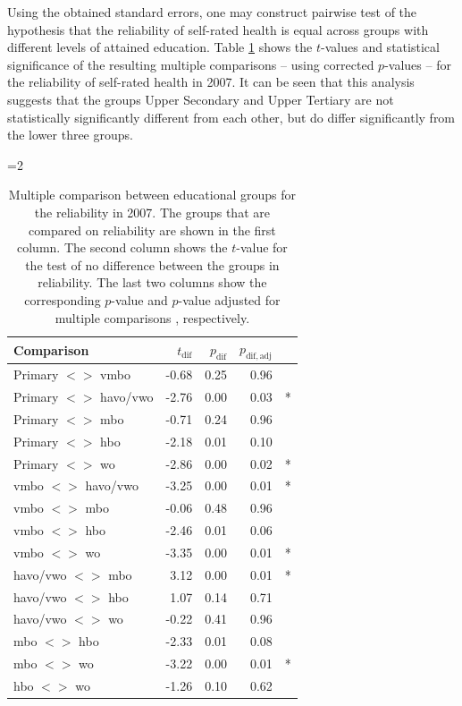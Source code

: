 \documentclass[a4paper,11pt]{article}
\newcommand{\0}{\boldsymbol{0}}
\begin{document}
Using the obtained standard errors, one may construct pairwise test of the hypothesis that the reliability of self-rated health
is equal across groups with different levels of attained education. Table \ref{tab:tests} shows the $t$-values and statistical significance of the resulting multiple comparisons -- using corrected $p$-values  \citep{holm1979simple} -- for the reliability of self-rated health in 2007. It can be seen that this analysis suggests that the 
groups Upper Secondary and Upper Tertiary are not statistically significantly different from each other, but do 
differ significantly from the lower three groups.

=2
\begin{table}[ht]
\begin{center}
\begin{tabular}{lrrrl}
  \hline  \hline
 Comparison & $t_{\mathrm{dif}}$ & $p_{\mathrm{dif}}$ & $p_{\mathrm{dif,adj}}$ &  \\ 
  \hline
Primary $<$$>$ vmbo & -0.68 & 0.25 & 0.96 &  \\ 
Primary $<$$>$ havo/vwo & -2.76 & 0.00 & 0.03 & * \\ 
Primary $<$$>$ mbo & -0.71 & 0.24 & 0.96 &  \\ 
Primary $<$$>$ hbo & -2.18 & 0.01 & 0.10 &  \\ 
Primary $<$$>$ wo & -2.86 & 0.00 & 0.02 & * \\ 
vmbo $<$$>$ havo/vwo & -3.25 & 0.00 & 0.01 & * \\ 
vmbo $<$$>$ mbo & -0.06 & 0.48 & 0.96 &  \\ 
vmbo $<$$>$ hbo & -2.46 & 0.01 & 0.06 &  \\ 
vmbo $<$$>$ wo & -3.35 & 0.00 & 0.01 & * \\ 
 havo/vwo $<$$>$ mbo & 3.12 & 0.00 & 0.01 & * \\ 
 havo/vwo $<$$>$ hbo & 1.07 & 0.14 & 0.71 &  \\ 
 havo/vwo $<$$>$ wo & -0.22 & 0.41 & 0.96 &  \\ 
 mbo $<$$>$ hbo & -2.33 & 0.01 & 0.08 &  \\ 
 mbo $<$$>$ wo & -3.22 & 0.00 & 0.01 & * \\ 
 hbo $<$$>$ wo & -1.26 & 0.10 & 0.62 &  \\ 
   \hline  \hline
\end{tabular}\caption{Multiple comparison between educational groups for the reliability in 2007. 
	The groups that are compared on reliability are shown in the first column. The second column shows the
	$t$-value for the test of no difference between the groups in reliability. The last two columns show 
	the corresponding $p$-value and $p$-value adjusted for multiple comparisons \citep{holm1979simple}, respectively.}\label{tab:tests}
\end{center}
\end{table}
\end{document}
